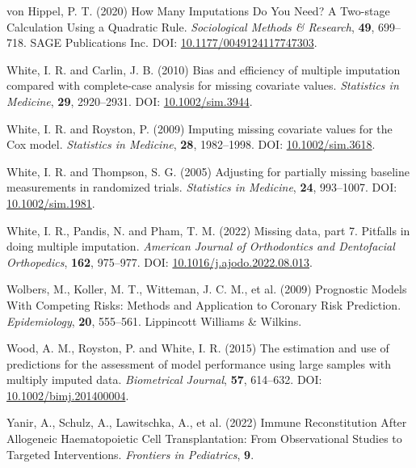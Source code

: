 \documentclass[
  letterpaper,
  paper=240mm:170mm,
  twoside=true,
  open=right,
  fontsize=10pt,
  pagesize=false,
  BCOR=15mm,
  DIV=14,
  headinclude=true,
  footinclude=false,
  headsepline=on]{scrbook}
\newlength{\cslhangindent}
\newenvironment{CSLReferences}[2] %
 {\begin{list}{}{%
  \setlength{\itemindent}{0pt}
  \setlength{\leftmargin}{0pt}
  \setlength{\parsep}{0pt}
  \ifodd #1
   \setlength{\leftmargin}{\cslhangindent}
   \setlength{\itemindent}{-1\cslhangindent}
  \fi
  \setlength{\itemsep}{#2\baselineskip}}}
 {\end{list}}
\begin{document}
\begin{CSLReferences}{1}{1}
von Hippel, P. T. (2020) How {Many Imputations Do You Need}? {A
Two-stage Calculation Using} a {Quadratic Rule}. \emph{Sociological
Methods \& Research}, \textbf{49}, 699--718. SAGE Publications Inc. DOI:
\href{https://doi.org/10.1177/0049124117747303}{10.1177/0049124117747303}.

White, I. R. and Carlin, J. B. (2010) Bias and efficiency of multiple
imputation compared with complete-case analysis for missing covariate
values. \emph{Statistics in Medicine}, \textbf{29}, 2920--2931. DOI:
\href{https://doi.org/10.1002/sim.3944}{10.1002/sim.3944}.

White, I. R. and Royston, P. (2009) Imputing missing covariate values
for the {Cox} model. \emph{Statistics in Medicine}, \textbf{28},
1982--1998. DOI:
\href{https://doi.org/10.1002/sim.3618}{10.1002/sim.3618}.

White, I. R. and Thompson, S. G. (2005) Adjusting for partially missing
baseline measurements in randomized trials. \emph{Statistics in
Medicine}, \textbf{24}, 993--1007. DOI:
\href{https://doi.org/10.1002/sim.1981}{10.1002/sim.1981}.

White, I. R., Pandis, N. and Pham, T. M. (2022) Missing data, part 7.
{Pitfalls} in doing multiple imputation. \emph{American Journal of
Orthodontics and Dentofacial Orthopedics}, \textbf{162}, 975--977. DOI:
\href{https://doi.org/10.1016/j.ajodo.2022.08.013}{10.1016/j.ajodo.2022.08.013}.

Wolbers, M., Koller, M. T., Witteman, J. C. M., et al. (2009) Prognostic
{Models With Competing Risks}: {Methods} and {Application} to {Coronary
Risk Prediction}. \emph{Epidemiology}, \textbf{20}, 555--561. Lippincott
Williams \& Wilkins.

Wood, A. M., Royston, P. and White, I. R. (2015) The estimation and use
of predictions for the assessment of model performance using large
samples with multiply imputed data. \emph{Biometrical Journal},
\textbf{57}, 614--632. DOI:
\href{https://doi.org/10.1002/bimj.201400004}{10.1002/bimj.201400004}.

Yanir, A., Schulz, A., Lawitschka, A., et al. (2022) Immune
{Reconstitution After Allogeneic Haematopoietic Cell Transplantation}:
{From Observational Studies} to {Targeted Interventions}.
\emph{Frontiers in Pediatrics}, \textbf{9}.


\end{CSLReferences}
\end{document}

